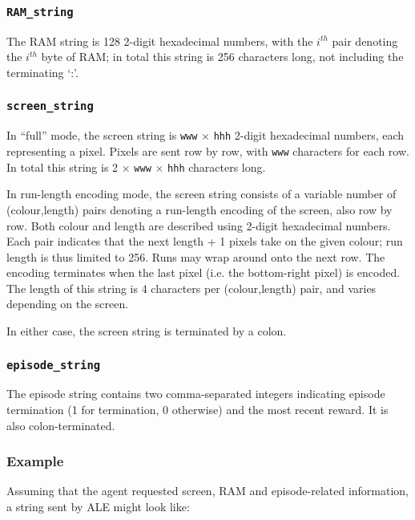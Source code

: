 \documentclass[12pt]{article}
\begin{document}
\subsubsection{\texttt{RAM\_string}}

The RAM string is 128 2-digit hexadecimal numbers, with the $i^{th}$ pair denoting the
$i^{th}$ byte of RAM; in total this string is 256 characters long, not including the terminating
`:'.

\subsubsection{\texttt{screen\_string}}

In ``full'' mode, the screen string is \texttt{www} $\times$ \texttt{hhh} 2-digit hexadecimal numbers, each representing a pixel. Pixels are sent row by row, with \texttt{www} characters for each row. In total this string is 2 $\times$ \texttt{www} $\times$ \texttt{hhh} characters long.

In run-length encoding mode, the screen string consists of a variable number of (colour,length) pairs denoting a run-length encoding of the screen, also row by row. Both colour and length are described using 2-digit hexadecimal numbers. Each pair indicates that the next length + 1 pixels take on the given colour; run length is thus limited to 256. Runs may wrap around onto the next row. The encoding terminates when the last pixel (i.e. the bottom-right pixel) is encoded. The length of this string is 4 characters per (colour,length) pair, and varies depending on the screen.

In either case, the screen string is terminated by a colon.

\subsubsection{\texttt{episode\_string}}

The episode string contains two comma-separated integers indicating episode termination (1 for
termination, 0 otherwise) and the most recent reward. It is also colon-terminated.

\subsubsection{Example}

Assuming that the agent requested screen, RAM and episode-related information, a string sent by ALE might look like:
\end{document}
